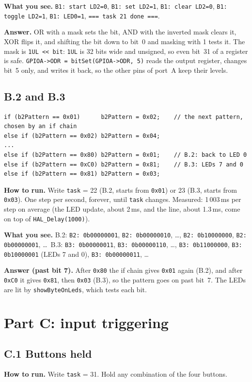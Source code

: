 \documentclass[11pt,a4paper]{article}
\newcommand{\lv}[1]{\texttt{#1}}                 %
\newcommand{\run}[1]{\textbf{How to run.} #1}
\newcommand{\see}[1]{\textbf{What you see.} #1}
\begin{document}
\see{\texttt{B1: start LD2=0}, \texttt{B1: set LD2=1}, \texttt{B1: clear LD2=0}, \texttt{B1: toggle LD2=1},
\texttt{B1: LED0=1}, \texttt{=== task 21 done ===}.}

\textbf{Answer.} OR with a mask sets the bit, AND with the inverted mask clears it, XOR flips it, and shifting the bit
down to bit~0 and masking with 1 tests it. The mask is \texttt{1UL << bit}: \texttt{1UL} is 32 bits wide and unsigned,
so even bit~31 of a register is safe. \texttt{GPIOA->ODR = bitSet(GPIOA->ODR, 5)} reads the output register, changes
bit~5 only, and writes it back, so the other pins of port~A keep their levels.

\subsection*{B.2 and B.3}
\begin{lstlisting}
if (b2Pattern == 0x01)      b2Pattern = 0x02;    // the next pattern, chosen by an if chain
else if (b2Pattern == 0x02) b2Pattern = 0x04;
...
else if (b2Pattern == 0x80) b2Pattern = 0x01;    // B.2: back to LED 0
else if (b2Pattern == 0xC0) b2Pattern = 0x81;    // B.3: LEDs 7 and 0
else if (b2Pattern == 0x81) b2Pattern = 0x03;
\end{lstlisting}
\run{Write \lv{task} = 22 (B.2, starts from \texttt{0x01}) or 23 (B.3, starts from \texttt{0x03}). One step per
second, forever, until \lv{task} changes. Measured: 1\,003\,ms per step on average (the LED update, about 2\,ms, and
the line, about 1.3\,ms, come on top of \texttt{HAL\_Delay(1000)}).}

\see{B.2: \texttt{B2: 0b00000001}, \texttt{B2: 0b00000010}, \ldots, \texttt{B2: 0b10000000}, \texttt{B2: 0b00000001},
\ldots\ B.3: \texttt{B3: 0b00000011}, \texttt{B3: 0b00000110}, \ldots, \texttt{B3: 0b11000000}, \texttt{B3: 0b10000001}
(LEDs 7 and 0), \texttt{B3: 0b00000011}, \ldots}

\textbf{Answer (past bit 7).} After \texttt{0x80} the if chain gives \texttt{0x01} again (B.2), and after
\texttt{0xC0} it gives \texttt{0x81}, then \texttt{0x03} (B.3), so the pattern goes on past bit~7. The LEDs are
lit by \texttt{showByteOnLeds}, which tests each bit.

\section{Part C: input triggering}

\subsection*{C.1 Buttons held}
\run{Write \lv{task} = 31. Hold any combination of the four buttons.}
\end{document}
